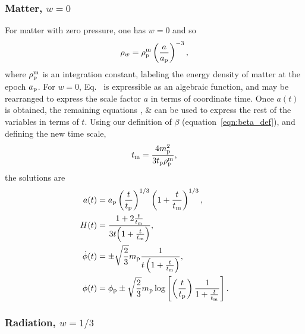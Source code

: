 \subsubsection{Matter, $w=0$}
For matter with zero pressure, one has $w=0$ and so
%
\begin{equation}
  \rho_w = \rho_{\mathrm{p}}^{\mathrm{m}}\left(\frac{a}{a_{\mathrm{p}}}\right)^{-3},
\end{equation}
%
where $\rho_{\mathrm{p}}^{\mathrm{m}}$ is an integration constant, labeling the energy density
of matter at the epoch $a_{\mathrm{p}}$.  For $w=0$, Eq.\ 
is expressible as an algebraic function, and may be rearranged to
express the scale factor $a$ in terms of coordinate time. Once $a(t)$
is obtained, the remaining equations ,
 \&  can be used to express
the rest of the variables in terms of $t$. Using our definition of
$\beta$ (equation~\ref{eqn:beta_def}), and defining the new time scale,
%
\begin{equation}
  t_{\mathrm{m}} = \frac{4m_{\mathrm{p}}^2}{3t_{\mathrm{p}}\rho_{\mathrm{p}}^{\mathrm{m}} },
  \label{eqn:tm}
\end{equation}
the solutions are
%
\begin{align}
  a(t)
  &=
  a_{\mathrm{p}}\left(\frac{t}{t_{\mathrm{p}}}\right)^{1/3}
  \left(1+\frac{t}{t_{\mathrm{m}}}\right)^{1/3} ,
  \\
  H(t) &= 
  \frac{1+2\frac{t}{t_{\mathrm{m}}}}{3t{{\left( 1+\frac{t}{t_{\mathrm{m}}} \right) }}},
  \\
  \dot{\phi}(t) &= 
  \pm\sqrt{\frac{2}{3}}m_{\mathrm{p}}
  \frac{1}
  {t \left( 1+\frac{t}{t_{\mathrm{m}}} \right) },
  \\
  \phi(t) &=
  \phi_{\mathrm{p}} \pm \sqrt{\frac{2}{3}}m_{\mathrm{p}} \log\left[  
  \left(\frac{t}{t_{\mathrm{p}}}\right) 
  \frac {1}{1+\frac{t}{t_{\mathrm{m}}}}  
  \right].
\end{align}
%




\subsubsection{Radiation, $w=1/3$}

